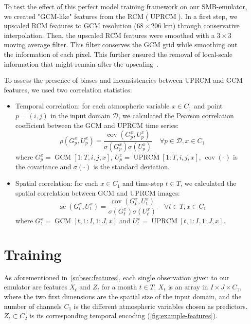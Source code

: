 \documentclass[a4paper,11pt,oneside]{report}
\begin{document}
To test the effect of this perfect model training framework on our SMB-emulator, we created "GCM-like" features from the RCM ($\operatorname{UPRCM}$). In a first step, we upscaled RCM features to GCM resolution ($68\times206$ km) through conservative interpolation. Then, the upscaled RCM features were smoothed with a $3\times3$ moving average filter. This filter conserves the GCM grid while smoothing out the information of each pixel. This further ensured the removal of local-scale information that might remain after the upscaling~\cite{Doury, Klaver2020}.


To assess the presence of biases and inconsistencies between UPRCM and GCM features, we used two correlation statistics:  
\begin{itemize}
        \item Temporal correlation: for each atmospheric variable $x\in C_1$ and point $p = (i,j)$ in the input domain $\mathcal{D}$, we calculated the Pearson correlation coefficient between the GCM and UPRCM time series:
        \begin{equation}\label{eq:temporal-corr}
            \rho\left(G_{p}^x,U_{p}^x\right) = \frac{\operatorname{cov}(G_{p}^x,U_{p}^x)}{\sigma(G_{p}^x)\sigma(U_{p}^x)} \;\;\;\; \forall p \in \mathcal{D}, x\in C_1 
        \end{equation}
        where $G_{p}^x = \operatorname{GCM}[1:T, i, j, x]$, $U_{p}^x = \operatorname{UPRCM}[1:T, i, j, x]$, $\operatorname {cov}(\cdot)$  is the covariance and  $\sigma(\cdot)$ is the standard deviation.  
        \item Spatial correlation: for each $x\in C_1$ and time-step $t \in T$, we calculated the spatial correlation between GCM and UPRCM images: 
        \begin{equation}\label{eq:spatial-corr}
            \operatorname{sc}\left(G_{t}^x,U_{t}^x\right) = \frac{\operatorname{cov}(G_{t}^x,U_{t}^x)}{\sigma(G_{t}^x)\sigma(U_{t}^x)} \;\;\;\; \forall t \in T, x\in C_1 
        \end{equation}
        where $G_{t}^x = \operatorname{GCM}[t,1:I,1:J,x]$ and $U_{t}^x =\operatorname{UPRCM}[t,1:I,1:J,x]$. 
    \end{itemize}


\section{Training}\label{subsec:training}
As aforementioned in~\autoref{subsec:features}, each single observation given to our emulator are features $X_t$ and $Z_t$ for a month $t\in T$. $X_t$ is an array in $I \times J \times C_1$, where the two first dimensions are the spatial size of the input domain, and the number of channels $C_1$ is the different atmospheric variables chosen as predictors. $Z_t \subset C_2$ is its corresponding temporal encoding (\autoref{fig:example-features}).
\end{document}
